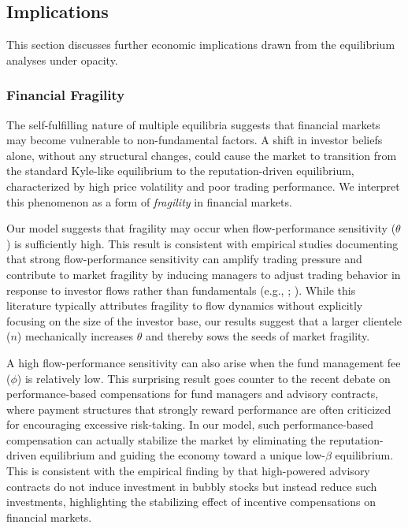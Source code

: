 \subsection{Implications}\label{ss:implications}
This section discusses further economic implications drawn from the equilibrium analyses under opacity.

\subsubsection{Financial Fragility}\label{sss:fragility}

The self-fulfilling nature of multiple equilibria suggests that financial markets may become vulnerable to non-fundamental factors. A shift in investor beliefs alone, without any structural changes, could cause the market to transition from the standard Kyle-like equilibrium to the reputation-driven equilibrium, characterized by high price volatility and poor trading performance.
We interpret this phenomenon as a form of \textit{fragility} in financial markets.

Our model suggests that fragility may occur when flow-performance sensitivity ($\theta$) is sufficiently high. This result is consistent with empirical studies documenting that strong flow-performance sensitivity can amplify trading pressure and contribute to market fragility by inducing managers to adjust trading behavior in response to investor flows rather than fundamentals (e.g., \citealp*{coval2007assetfiresales}; \citealp*{goldstein2017investorflows}). While this literature typically attributes fragility to flow dynamics without explicitly focusing on the size of the investor base, our results suggest that a larger clientele ($n$) mechanically increases $\theta$ and thereby sows the seeds of market fragility.

A high flow-performance sensitivity can also arise when the fund management fee ($\phi$) is relatively low. This surprising result goes counter to the recent debate on performance-based compensations for fund managers and advisory contracts, where payment structures that strongly reward performance are often criticized for encouraging excessive risk-taking. In our model, such performance-based compensation can actually stabilize the market by eliminating the reputation-driven equilibrium and guiding the economy toward a unique low-$\beta$ equilibrium. This is consistent with the empirical finding by \citet*{dass2008mutual} that high-powered advisory contracts do not induce investment in bubbly stocks but instead reduce such investments, highlighting the stabilizing effect of incentive compensations on financial markets.


